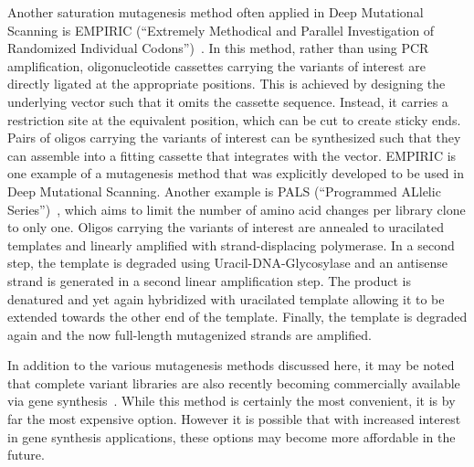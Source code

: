 Another saturation mutagenesis method often applied in Deep Mutational Scanning is EMPIRIC (``Extremely Methodical and Parallel Investigation of Randomized Individual Codons'')~\cite{hietpas_experimental_2011}. In this method, rather than using PCR amplification, oligonucleotide cassettes carrying the variants of interest are directly ligated at the appropriate positions. This is achieved by designing the underlying vector such that it omits the cassette sequence. Instead, it carries a restriction site at the equivalent position, which can be cut to create sticky ends. Pairs of oligos carrying the variants of interest can be synthesized such that they can assemble into a fitting cassette that integrates with the vector.
EMPIRIC is one example of a mutagenesis method that was explicitly developed to be used in Deep Mutational Scanning. Another example is PALS (``Programmed ALlelic Series'')~\cite{kitzman_massively_2015}, which aims to limit the number of amino acid changes per library clone to only one. Oligos carrying the variants of interest are annealed to uracilated templates and linearly amplified with strand-displacing polymerase. In a second step, the template is degraded using Uracil-DNA-Glycosylase and an antisense strand is generated in a second linear amplification step. The product is denatured and yet again hybridized with uracilated template allowing it to be extended towards the other end of the template. Finally, the template is degraded again and the now full-length mutagenized strands are amplified.

In addition to the various mutagenesis methods discussed here, it may be noted that complete variant libraries are also recently becoming commercially available via gene synthesis~\cite{kosuri_scalable_2010}. While this method is certainly the most convenient, it is by far the most expensive option. However it is possible that with increased interest in gene synthesis applications, these options may become more affordable in the future.



